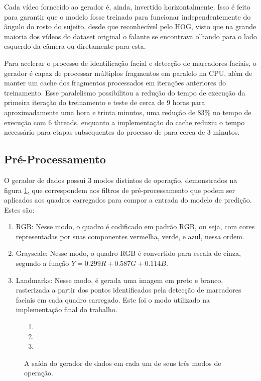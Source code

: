Cada vídeo fornecido ao gerador é, ainda, invertido horizontalmente.
Isso é feito para garantir que o modelo fosse treinado para funcionar independentemente do ângulo do rosto do sujeito, desde que reconhecível pelo HOG, visto que na grande maioria dos vídeos do dataset original o falante se encontrava olhando para o lado esquerdo da câmera ou diretamente para esta.

Para acelerar o processo de identificação facial e detecção de marcadores faciais, o gerador é capaz de processar múltiplos fragmentos em paralelo na CPU, além de manter um cache dos fragmentos processados em iterações anteriores do treinamento.
Esse paralelismo possibilitou a redução do tempo de execução da primeira iteração do treinamento e teste de cerca de 9 horas para aproximadamente uma hora e trinta minutos, uma redução de 83\% no tempo de execução com 6 threads, enquanto a implementação do cache reduziu o tempo necessário para etapas subsequentes do processo de para cerca de 3 minutos.

\subsection{Pré-Processamento}
\label{sec:pre-processing}

O gerador de dados possui 3 modos distintos de operação, demonstrados na figura \ref{fig:generator_out}, que correspondem aos filtros de pré-processamento que podem ser aplicados aos quadros carregados para compor a entrada do modelo de predição. Estes são:

\begin{enumerate}[label={(\arabic*)}]
    \item RGB: Nesse modo, o quadro é codificado em padrão RGB, ou seja, com cores representadas por suas componentes vermelha, verde, e azul, nessa ordem.
    \item Grayscale: Nesse modo, o quadro RGB é convertido para escala de cinza, segundo a função $Y = 0.299 R + 0.587 G + 0.114 B$.
    \item Landmarks: Nesse modo, é gerada uma imagem em preto e branco, rasterizada a partir dos pontos identificados pela detecção de marcadores faciais em cada quadro carregado. Este foi o modo utilizado na implementação final do trabalho.
\end{enumerate}

\begin{figure}[ht]
    \centering
    \begin{enumerate}[label={(\arabic*)}]
        \item \parbox{\linewidth}{\centering
            
        }
        \item \parbox{\linewidth}{\centering
            
        }
        \item \parbox{\linewidth}{\centering
            
        }
    \end{enumerate}
    \caption{A saída do gerador de dados em cada um de seus três modos de operação.}
    \label{fig:generator_out}
\end{figure}


